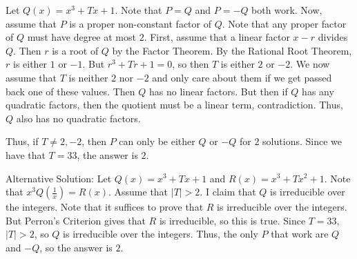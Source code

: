 Let $Q\left(x\right)=x^3+Tx+1$. Note that $P=Q$ and $P=-Q$ both work. Now, assume that $P$ is a proper non-constant factor of $Q$. Note that any proper factor of $Q$ must have degree at most $2$. First, assume that a linear factor $x-r$ divides $Q$. Then $r$ is a root of $Q$ by the Factor Theorem. By the Rational Root Theorem, $r$ is either $1$ or $-1$. But $r^3+Tr+1=0$, so then $T$ is either $2$ or $-2$. We now assume that $T$ is neither $2$ nor $-2$ and only care about them if we get passed back one of these values. Then $Q$ has no linear factors. But then if $Q$ has any quadratic factors, then the quotient must be a linear term, contradiction. Thus, $Q$ also has no quadratic factors.

Thus, if $T\neq2,-2$, then $P$ can only be either $Q$ or $-Q$ for $2$ solutions. Since we have that $T=33$, the answer is $\boxed{2}$.

Alternative Solution: Let $Q\left(x\right)=x^3+Tx+1$ and $R\left(x\right)=x^3+Tx^2+1$. Note that $x^3Q\left(\frac{1}{x}\right)=R\left(x\right)$. Assume that $\left|T\right|>2$. I claim that $Q$ is irreducible over the integers. Note that it suffices to prove that $R$ is irreducible over the integers. But Perron's Criterion gives that $R$ is irreducible, so this is true. Since $T=33$, $\left|T\right|>2$, so $Q$ is irreducible over the integers. Thus, the only $P$ that work are $Q$ and $-Q$, so the answer is $\boxed{2}$.